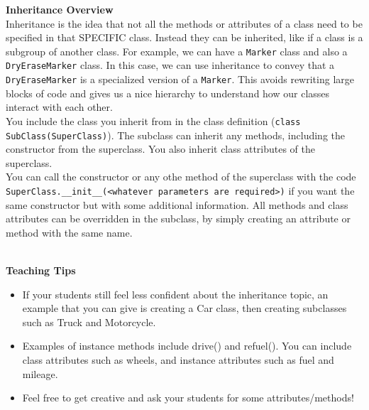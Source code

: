 \textbf{Inheritance Overview} \\
Inheritance is the idea that not all the methods or attributes of a class need to be specified in that SPECIFIC class. Instead they can be inherited, like if a class is a subgroup of another class.
For example, we can have a \lstinline{Marker} class and also a \lstinline{DryEraseMarker} class. In this case, we can use inheritance to convey that a \lstinline{DryEraseMarker} is a specialized version of a \lstinline{Marker}.
This avoids rewriting large blocks of code and gives us a nice hierarchy to understand how our classes interact with each other. \\

You include the class you inherit from in the class definition (\lstinline{class SubClass(SuperClass)}). The subclass can inherit any methods, including the constructor from the superclass. You also inherit class attributes of the superclass. \\
You can call the constructor or any othe method of the superclass with the code \lstinline{SuperClass.__init__(<whatever parameters are required>)} if you want the same constructor but with some additional information. All methods and class attributes can be overridden in the subclass, by simply creating an attribute or method with the same name. \\\\
\begin{guide}
\textbf{Teaching Tips}
\begin{itemize}
  \item If your students still feel less confident about the inheritance topic, an example that you can give is creating a Car class, then creating subclasses such as Truck and Motorcycle.
  \item Examples of instance methods include drive() and refuel(). You can include class attributes such as wheels, and instance attributes such as fuel and mileage.
  \item Feel free to get creative and ask your students for some attributes/methods!
\end{itemize}
\end{guide}
